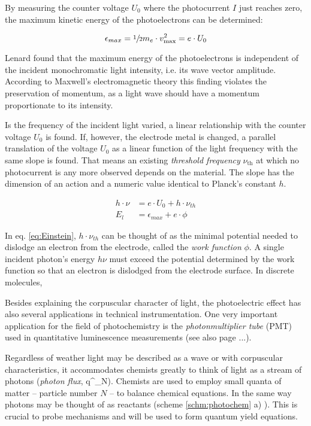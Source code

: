 	By measuring the counter voltage $U_0$ where the photocurrent $I$ just reaches zero, the maximum kinetic energy of the photoelectrons can be determined:

	\begin{equation}[h]%
		\epsilon_{max} = \sfrac{1}{2}m_e\cdot v^2_\mathrm{max} = e\cdot U_0
	\end{equation}

	Lenard found that the maximum energy of the photoelectrons is independent of the incident monochromatic light intensity, i.e. its wave vector amplitude. According to Maxwell's electromagnetic theory this finding violates the preservation of momentum, as a light wave should have a momentum proportionate to its intensity. 

	Is the frequency of the incident light varied, a linear relationship with the counter voltage $U_0$ is found. If, however, the electrode metal is changed, a parallel translation of the voltage $U_0$ as a linear function of the light frequency with the same slope is found. That means an existing \emph{threshold frequency} $\nu_\mathrm{th}$ at which no photocurrent is any more observed depends on the material. The slope has the dimension of an action and a numeric value identical to Planck's constant $h$. 

	\begin{equation}[h]%
		\label{eq:Einstein}
		\begin{split}%
			h\cdot\nu &= e\cdot U_0 + h\cdot\nu_{th} \\
			E_l &= \epsilon_{max} + e\cdot\phi
		\end{split}
	\end{equation}

	In eq. \ref{eq:Einstein}, $h\cdot\nu_{th}$ can be thought of as the minimal potential needed to dislodge an electron from the electrode, called the \emph{work function} $\phi$. A single incident photon's energy $h\nu$ must exceed the potential determined by the work function so that an electron is dislodged from the electrode surface. In discrete molecules,

	Besides explaining the corpuscular character of light, the photoelectric effect has also several applications in technical instrumentation. One very important application for the field of photochemistry is the \emph{photonmultiplier tube} (PMT) used in quantitative luminescence measurements (see also page ...).

	Regardless of weather light may be described as a wave or with corpuscular characteristics, it accommodates chemists greatly to think of light as a stream of photons (\emph{photon flux}, q^_N). Chemists are used to employ small quanta of matter -- particle number $N$ -- to balance chemical equations. In the same way photons may be thought of as reactants (scheme \ref{schm:photochem} a) ). This is crucial to probe mechanisms and will be used to form quantum yield equations. 

